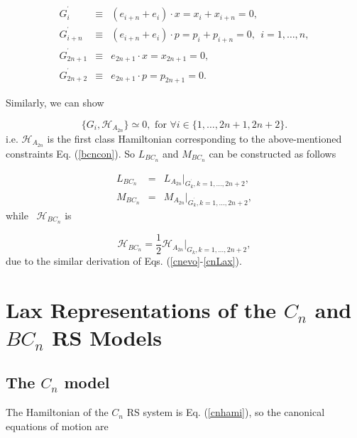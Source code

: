 \documentclass[a4paper,12pt]{article}
\begin{document}
\begin{eqnarray}
G_{i}^{^{\prime }} &\equiv &(e_{i+n}+e_{i})\cdot
x=x_{i}+x_{i+n}=0,
\nonumber \\
G_{i+n}^{^{\prime }} &\equiv &(e_{i+n}+e_{i})\cdot
p=p_{i}+p_{i+n}=0,\ \ i=1,\ldots ,n,  \nonumber \\
G_{2n+1}^{^{\prime }} &\equiv &e_{2n+1}\cdot x=x_{2n+1}=0,
\nonumber \\ G_{2n+2}^{^{\prime }} &\equiv &e_{2n+1}\cdot
p=p_{2n+1}=0.  \label{bcncon}
\end{eqnarray}

\noindent Similarly, we can show

\begin{equation}
\{G_{i},\mathcal{H}_{A_{2n}}\}\simeq 0,\mbox{\ \ \ for \ \ \ \ }\forall i\in
\{1,\ldots ,2n+1,2n+2\}.
\end{equation}
i.e. $\mathcal{H}_{A_{2n}}$ is the first class Hamiltonian
corresponding to the above-mentioned constraints Eq.
(\ref{bcncon}). So $L_{BC_{n}}$ and $M_{BC_{n}}$ can be
constructed as follows

\begin{eqnarray}
L_{BC_{n}} &=&L_{A_{2n}}|_{G_{k}^{^{\prime }},k=1,...,2n+2},
\nonumber \\ M_{BC_{n}} &=&M_{A_{2n}}|_{G_{k}^{^{\prime
}},k=1,...,2n+2},
\end{eqnarray}
while \ $\mathcal{H}_{BC_{n}}$ is

\begin{equation}
\mathcal{H}_{BC_{n}}=\frac{1}{2}\mathcal{H}_{A_{2n}}|_{G_{k},k=1,...,2n+2},
\end{equation}
due to the similar derivation of Eqs.
(\ref{cnevo}-\ref{cnLax}).

\section{Lax Representations of the $C_{n}$ and $BC_{n}$ RS Models}

\label{lax} \setcounter{equation}{0}

\subsection{The $C_{n}$ model}

The Hamiltonian of the $C_{n}$ RS system is Eq.
(\ref{cnhami}), so the canonical equations of motion are
\end{document}
